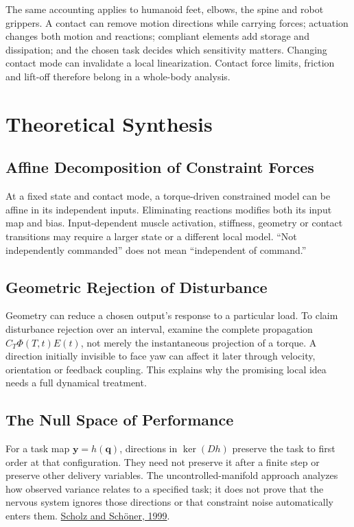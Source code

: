 \documentclass[
  11pt,
]{article}
\begin{document}
The same accounting applies to humanoid feet, elbows, the spine and
robot grippers. A contact can remove motion directions while carrying
forces; actuation changes both motion and reactions; compliant elements
add storage and dissipation; and the chosen task decides which
sensitivity matters. Changing contact mode can invalidate a local
linearization. Contact force limits, friction and lift-off therefore
belong in a whole-body analysis.

\section{Theoretical Synthesis}\label{theoretical-synthesis}

\subsection{Affine Decomposition of Constraint
Forces}\label{affine-decomposition-of-constraint-forces}

At a fixed state and contact mode, a torque-driven constrained model can
be affine in its independent inputs. Eliminating reactions modifies both
its input map and bias. Input-dependent muscle activation, stiffness,
geometry or contact transitions may require a larger state or a
different local model. ``Not independently commanded'' does not mean
``independent of command.''

\subsection{Geometric Rejection of
Disturbance}\label{geometric-rejection-of-disturbance}

Geometry can reduce a chosen output's response to a particular load. To
claim disturbance rejection over an interval, examine the complete
propagation \(C_T\Phi(T,t)E(t)\), not merely the instantaneous
projection of a torque. A direction initially invisible to face yaw can
affect it later through velocity, orientation or feedback coupling. This
explains why the promising local idea needs a full dynamical treatment.

\subsection{The Null Space of
Performance}\label{the-null-space-of-performance}

For a task map \(\mathbf y=h(\mathbf q)\), directions in \(\ker(Dh)\)
preserve the task to first order at that configuration. They need not
preserve it after a finite step or preserve other delivery variables.
The uncontrolled-manifold approach analyzes how observed variance
relates to a specified task; it does not prove that the nervous system
ignores those directions or that constraint noise automatically enters
them. \href{https://pubmed.ncbi.nlm.nih.gov/10382616/}{Scholz and
Schöner, 1999}.
\end{document}
